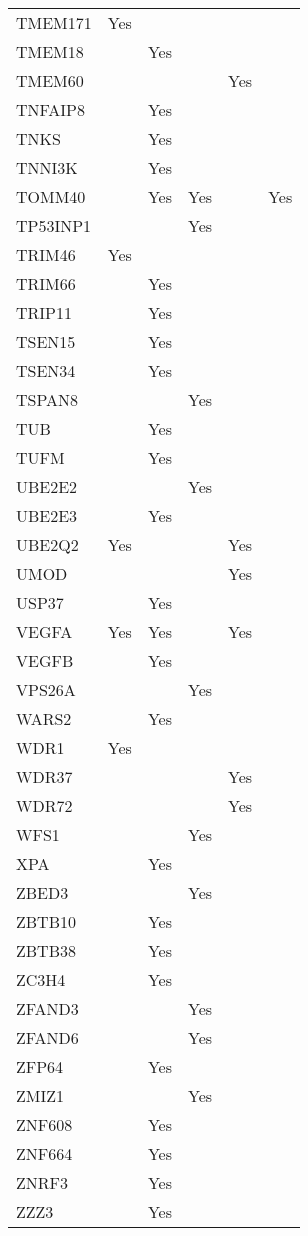 \documentclass[]{report}
\begin{document}
\begin{appendices}
\begin{longtable}[t]{llllll}
TMEM171 & Yes &  &  &  & \\
TMEM18 &  & Yes &  &  & \\
TMEM60 &  &  &  & Yes & \\
TNFAIP8 &  & Yes &  &  & \\
TNKS &  & Yes &  &  & \\
TNNI3K &  & Yes &  &  & \\
TOMM40 &  & Yes & Yes &  & Yes\\
TP53INP1 &  &  & Yes &  & \\
TRIM46 & Yes &  &  &  & \\
TRIM66 &  & Yes &  &  & \\
TRIP11 &  & Yes &  &  & \\
TSEN15 &  & Yes &  &  & \\
TSEN34 &  & Yes &  &  & \\
TSPAN8 &  &  & Yes &  & \\
TUB &  & Yes &  &  & \\
TUFM &  & Yes &  &  & \\
UBE2E2 &  &  & Yes &  & \\
UBE2E3 &  & Yes &  &  & \\
UBE2Q2 & Yes &  &  & Yes & \\
UMOD &  &  &  & Yes & \\
USP37 &  & Yes &  &  & \\
VEGFA & Yes & Yes &  & Yes & \\
VEGFB &  & Yes &  &  & \\
VPS26A &  &  & Yes &  & \\
WARS2 &  & Yes &  &  & \\
WDR1 & Yes &  &  &  & \\
WDR37 &  &  &  & Yes & \\
WDR72 &  &  &  & Yes & \\
WFS1 &  &  & Yes &  & \\
XPA &  & Yes &  &  & \\
ZBED3 &  &  & Yes &  & \\
ZBTB10 &  & Yes &  &  & \\
ZBTB38 &  & Yes &  &  & \\
ZC3H4 &  & Yes &  &  & \\
ZFAND3 &  &  & Yes &  & \\
ZFAND6 &  &  & Yes &  & \\
ZFP64 &  & Yes &  &  & \\
ZMIZ1 &  &  & Yes &  & \\
ZNF608 &  & Yes &  &  & \\
ZNF664 &  & Yes &  &  & \\
ZNRF3 &  & Yes &  &  & \\
ZZZ3 &  & Yes &  &  & \\*
\end{longtable}


\end{appendices}
\end{document}
